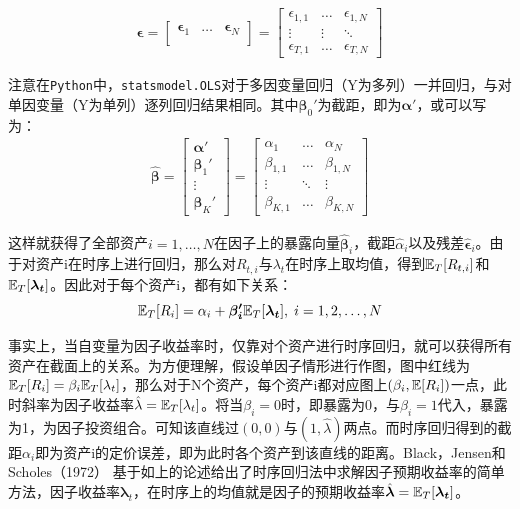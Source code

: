 \documentclass[11pt]{article}
\begin{document}
\begin{gather*}
    \\
    \bm{\epsilon} = \begin{bmatrix}
        \bm{\epsilon}_1 & \dots & \bm{\epsilon}_N \\
    \end{bmatrix}
    = \begin{bmatrix} \epsilon_{1,1} & \dots & \epsilon_{1,N} \\ \vdots & \vdots & \ddots \\ \epsilon_{T,1} & \dots & \epsilon_{T,N} \end{bmatrix}
\end{gather*}

注意在\verb|Python|中，\verb|statsmodel.OLS|对于多因变量回归（Y为多列）一并回归，与对单因变量（Y为单列）逐列回归结果相同。其中$\bm{\beta}_{0}'$为截距，即为$\bm{\alpha}'$，或可以写为：
\begin{gather*}
    \hat{\bm{\beta}}
    = \begin{bmatrix} \bm{\alpha}' \\ \bm{\beta}_{1}' \\ \vdots \\ \bm{\beta}_{K}' \end{bmatrix}
    = \begin{bmatrix} \alpha_{1} & \dots & \alpha_{N} \\ \beta_{1,1} & \dots & \beta_{1,N} \\ \vdots & \ddots & \vdots \\ \beta_{K,1} & \dots & \beta_{K,N} \end{bmatrix}
\end{gather*}

这样就获得了全部资产$i=1,\dots,N$在因子上的暴露向量$\hat{\bm{\beta}}_i$，截距$\hat{\alpha}_i$以及残差$\hat{\bm{\epsilon}}_i$。由于对资产i在时序上进行回归，那么对$R_{t,i}$与$\lambda_t$在时序上取均值，得到$\mathbb{E}_T[R_{t,i}]$和$\mathbb{E}_T[\bm{\lambda_t}]$。因此对于每个资产i，都有如下关系：
\begin{equation*}
    \mathbb{E}_T[R_i] = \alpha_i + \bm{\beta_{i}'} \mathbb{E}_T[\bm{\lambda_t}] ,\; i=1,2,\dots,N
\end{equation*}

事实上，当自变量为因子收益率时，仅靠对个资产进行时序回归，就可以获得所有资产在截面上的关系。为方便理解，假设单因子情形进行作图，图中红线为$\mathbb{E}_T[R_i] = \beta_i \mathbb{E}_T[\lambda_t]$，那么对于N个资产，每个资产i都对应图上$(\beta_i,\mathbb{E}[R_i])$一点，此时斜率为因子收益率$\hat{\lambda}=\mathbb{E}_T[\lambda_t]$。将当$\beta_i=0$时，即暴露为0，与$\beta_i=1$代入，暴露为1，为因子投资组合。可知该直线过$(0,0)$与$(1,\hat{\lambda})$两点。而时序回归得到的截距$\alpha_i$即为资产i的定价误差，即为此时各个资产到该直线的距离。Black，Jensen和Scholes（1972） 基于如上的论述给出了时序回归法中求解因子预期收益率的简单方法，因子收益率$\bm{\lambda}_t$，在时序上的均值就是因子的预期收益率$\hat{\bm{\lambda}} = \mathbb{E}_T[\bm{\lambda_t}]$。
\end{document}

